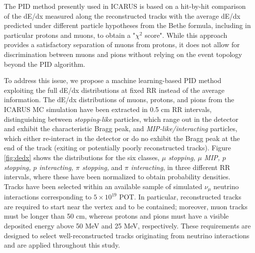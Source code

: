\documentclass[nocopyright]{cimento}
\begin{document}
The PID method presently used in ICARUS is based on a hit-by-hit comparison of the dE/dx measured along the reconstructed tracks with the average dE/dx predicted under different particle hypotheses from the Bethe formula, including in particular protons and muons, to obtain a "$\chi^2$ score".
While this approach provides a
satisfactory separation of muons from protons, it does not allow for discrimination between muons and pions
without relying on the event topology beyond the PID algorithm.

To address this issue, we propose a machine learning-based PID method exploiting the full dE/dx distributions at fixed RR instead of the average information.
The dE/dx distributions of muons, protons, and pions from the ICARUS MC simulation have been extracted in 0.5 cm RR intervals, distinguishing between \textit{stopping-like} particles, which range out in the detector and exhibit the characteristic Bragg peak, and \textit{MIP-like/interacting} particles, which either re-interact in the detector or do no exhibit the Bragg peak at the end of the track (exiting or potentially poorly reconstructed tracks). Figure \ref{fig:dedx} shows the distributions for the six classes, \textit{$\mu$ stopping, $\mu$ MIP, $p$ stopping, $p$ interacting, $\pi$ stopping,} and \textit{$\pi$ interacting}, in three different RR intervals, where these have been normalized to obtain probability densities. Tracks have been selected within an available sample of simulated $\nu_\mu$ neutrino interactions corresponding to $5\times10^{19}$ POT.
In particular, reconstructed tracks are required to start near the vertex and to be contained; moreover, muon tracks must be longer than 50 cm, whereas protons and pions must have a visible deposited energy above 50 MeV and 25 MeV, respectively. These requirements are designed to select well-reconstructed tracks originating from neutrino interactions and are applied throughout this study.

\end{document}
